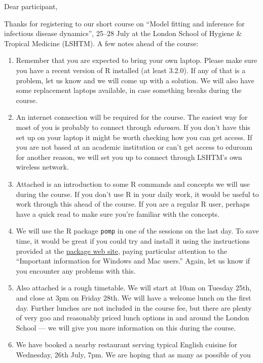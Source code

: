\documentclass[paper=a4, 11pt]{scrlttr2}
\begin{document}
\begin{letter}{}
\opening{Dear participant,}
Thanks for registering to our short course on ``Model fitting and
inference for infectious disease dynamics'', 25--28 July at the London
School of Hygiene \& Tropical Medicine (LSHTM). A few notes ahead of
the course:

\begin{enumerate}
\item Remember that you are expected to bring your own laptop. Please make sure
  you have a recent version of R installed
(at least 3.2.0). If any of that is a problem, let us know 
and we will come up with a solution. We will also have some replacement laptops
available, in case something breaks during the course.
\item An internet connection will be required for the course. The easiest
way for most of you is probably to connect through \emph{eduroam}. If you
don't have this set up on your laptop it might be worth checking how you
can get access. If you are not based at an academic institution or can't
get access to eduroam for another reason, we will set you up to connect
through LSHTM's own wireless network.
\item Attached is an introduction to some R commands and concepts
we will use during the course. If you don't use R in your daily work, it
would be useful to work through this ahead of the course. If you are a
regular R user, perhaps have a quick read to 
make sure you're familiar with the concepts.
\item We will use the R package \texttt{pomp} in one of the
  sessions on the last day. To save time, it would be great if you could try and
  install it using the instructions provided at the 
  \href{http://kingaa.github.io/pomp/vignettes/getting_started.html#installing-the-package}{package web site},
  paying particular attention to the ``Important information for
  Windows and Mac users.'' Again, let us know if you encounter any
  problems with this.
\item Also attached is a rough timetable. We will start at 10am on Tuesday 25th,
and close at 3pm on Friday 28th. We will have a welcome lunch on the first day.
Further lunches are not included in the course fee, but there are plenty of very
goo and reasonably priced lunch options in
and around the London School --- we will give you more information on
this during the course.
\item We have booked a nearby restaurant serving typical English cuisine for
Wednesday, 26th July, 7pm. We are hoping that as many as possible of you

\end{enumerate}
\end{letter}
\end{document}

